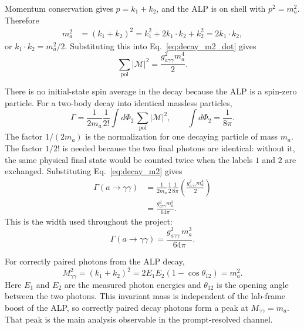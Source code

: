 \documentclass[12pt,a4paper]{article}
\begin{document}
Momentum conservation gives $p=k_1+k_2$, and the ALP is on shell with
$p^2=m_{a}^2$. Therefore
\begin{align}
    m_{a}^2
    &=
    (k_1+k_2)^2
    =
    k_1^2+2k_1\cdot k_2+k_2^2
    =
    2k_1\cdot k_2,
    \label{eq:k1k2_ma_relation}
\end{align}
or $k_1\cdot k_2=m_{a}^2/2$. Substituting this into
Eq.~\eqref{eq:decay_m2_dot} gives
\begin{equation}
    \sum_\mathrm{pol}|\mathcal{M}|^2
    =
    \frac{g_{a\gamma\gamma}^2m_{a}^4}{2}.
    \label{eq:decay_m2}
\end{equation}

There is no initial-state spin average in the decay because the ALP is a
spin-zero particle. For a two-body decay into identical massless particles,
\begin{equation}
    \Gamma
    =
    \frac{1}{2m_{a}}\frac{1}{2!}
    \int d\Phi_2\,\sum_\mathrm{pol}|\mathcal{M}|^2,
    \qquad
    \int d\Phi_2 = \frac{1}{8\pi}.
    \label{eq:decay_phase_space}
\end{equation}
The factor $1/(2m_{a})$ is the normalization for one decaying particle of mass
$m_{a}$. The factor $1/2!$ is needed because the two final photons are
identical: without it, the same physical final state would be counted twice
when the labels $1$ and $2$ are exchanged. Substituting
Eq.~\eqref{eq:decay_m2} gives
\begin{align}
    \Gamma(a\to\gamma\gamma)
    &=
    \frac{1}{2m_{a}}
    \frac{1}{2}
    \frac{1}{8\pi}
    \left(
      \frac{g_{a\gamma\gamma}^2m_{a}^4}{2}
    \right)
    \nonumber\\
    &=
    \frac{g_{a\gamma\gamma}^2m_{a}^3}{64\pi}.
    \label{eq:width_step}
\end{align}
This is the width used throughout the project:
\begin{equation}
    \Gamma(a\to\gamma\gamma)
    =
    \frac{g_{a\gamma\gamma}^2\,m_{a}^3}{64\pi}.
    \label{eq:width}
\end{equation}

For correctly paired photons from the ALP decay,
\begin{equation}
    M_{\gamma\gamma}^2=(k_1+k_2)^2
    =
    2E_1E_2(1-\cos\theta_{12})
    =
    m_{a}^2.
    \label{eq:mgg}
\end{equation}
Here $E_1$ and $E_2$ are the measured photon energies and $\theta_{12}$ is the
opening angle between the two photons. This invariant mass is independent of
the lab-frame boost of the ALP, so correctly paired decay photons form a peak
at $M_{\gamma\gamma}=m_{a}$. That peak is the main analysis observable in the
prompt-resolved channel.
\end{document}
